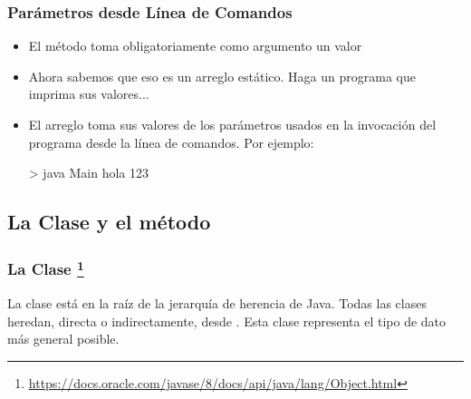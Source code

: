 \documentclass{beamer}
\begin{document}
\begin{frame}[fragile]
  \frametitle{Parámetros desde Línea de Comandos}
  \begin{itemize}
    
  \item El método  toma obligatoriamente como argumento un
    valor 
    
  \item Ahora sabemos que eso es un arreglo estático. Haga un programa
    que imprima sus valores...
    
  \item El arreglo toma sus valores de los parámetros usados en la
    invocación del programa desde la línea de comandos. Por ejemplo:

    \begin{jsmall}
      > java Main hola 123
    \end{jsmall}
    
  \end{itemize}

\end{frame}

\subsection{La Clase  y el método }

\begin{frame}
  \frametitle{La Clase \footnote{\url{https://docs.oracle.com/javase/8/docs/api/java/lang/Object.html}}}

  \begin{block}{}
    La clase  está en la raíz de la jerarquía de
    herencia de Java. Todas las clases heredan, directa o
    indirectamente, desde . Esta clase representa el
    tipo de dato más general posible.
  \end{block}
  
\end{frame}
\end{document}
